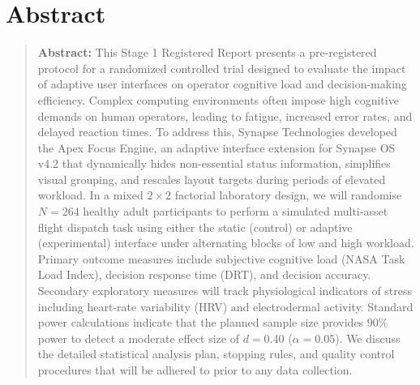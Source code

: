 \section*{Abstract}
\begin{quotation}
\noindent\textbf{Abstract:} This Stage 1 Registered Report presents a pre-registered protocol for a randomized controlled trial designed to evaluate the impact of adaptive user interfaces on operator cognitive load and decision-making efficiency. Complex computing environments often impose high cognitive demands on human operators, leading to fatigue, increased error rates, and delayed reaction times. To address this, Synapse Technologies developed the Apex Focus Engine, an adaptive interface extension for Synapse OS v4.2 that dynamically hides non-essential status information, simplifies visual grouping, and rescales layout targets during periods of elevated workload. In a mixed $2\times 2$ factorial laboratory design, we will randomise $N = 264$ healthy adult participants to perform a simulated multi-asset flight dispatch task using either the static (control) or adaptive (experimental) interface under alternating blocks of low and high workload. Primary outcome measures include subjective cognitive load (NASA Task Load Index), decision response time (DRT), and decision accuracy. Secondary exploratory measures will track physiological indicators of stress including heart-rate variability (HRV) and electrodermal activity. Standard power calculations indicate that the planned sample size provides $90\%$ power to detect a moderate effect size of $d = 0.40$ ($\alpha = 0.05$). We discuss the detailed statistical analysis plan, stopping rules, and quality control procedures that will be adhered to prior to any data collection.
\end{quotation}
